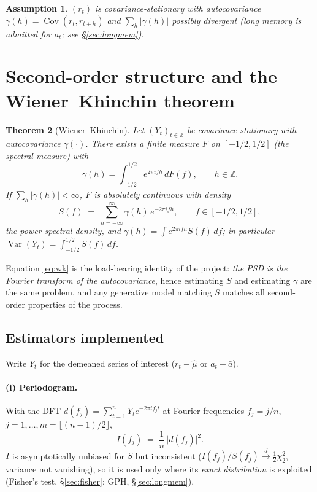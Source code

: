 \documentclass[11pt,a4paper]{article}
\newtheorem{theorem}{Theorem}[section]
\newtheorem{assumption}[theorem]{Assumption}
\DeclareMathOperator{\Var}{Var}
\DeclareMathOperator{\Cov}{Cov}
\begin{document}
\begin{assumption}\label{ass:stat}
$(r_t)$ is covariance-stationary with autocovariance
$\gamma(h)=\Cov(r_t,r_{t+h})$ and $\sum_h |\gamma(h)|$ possibly divergent (long
memory is admitted for $a_t$; see \S\ref{sec:longmem}).
\end{assumption}

\section{Second-order structure and the Wiener--Khinchin theorem}

\begin{theorem}[Wiener--Khinchin]\label{thm:wk}
Let $(Y_t)_{t\in\mathbb{Z}}$ be covariance-stationary with autocovariance
$\gamma(\cdot)$. There exists a finite measure $F$ on $[-1/2,1/2]$ (the spectral
measure) with
\begin{equation}
\gamma(h) = \int_{-1/2}^{1/2} e^{2\pi i f h}\, dF(f), \qquad h\in\mathbb{Z}.
\end{equation}
If $\sum_h |\gamma(h)|<\infty$, $F$ is absolutely continuous with density
\begin{equation}
S(f) \;=\; \sum_{h=-\infty}^{\infty} \gamma(h)\, e^{-2\pi i f h},
\qquad f \in [-1/2, 1/2],
\label{eq:wk}
\end{equation}
the \emph{power spectral density}, and $\gamma(h)=\int e^{2\pi ifh}S(f)\,df$; in
particular $\Var(Y_t)=\int_{-1/2}^{1/2} S(f)\,df$.
\end{theorem}

Equation \eqref{eq:wk} is the load-bearing identity of the project: \emph{the PSD is
the Fourier transform of the autocovariance}, hence estimating $S$ and estimating
$\gamma$ are the same problem, and any generative model matching $S$ matches all
second-order properties of the process.

\subsection{Estimators implemented}\label{sec:estimators}

Write $Y_t$ for the demeaned series of interest ($r_t-\hat\mu$ or $a_t-\bar a$).

\paragraph{(i) Periodogram.} With the DFT
$d(f_j)=\sum_{t=1}^{n} Y_t e^{-2\pi i f_j t}$ at Fourier frequencies
$f_j=j/n$, $j=1,\dots,m=\lfloor (n-1)/2\rfloor$,
\begin{equation}
I(f_j) \;=\; \frac{1}{n}\,\bigl|d(f_j)\bigr|^2 .
\end{equation}
$I$ is asymptotically unbiased for $S$ but inconsistent
($I(f_j)/S(f_j)\xrightarrow{d}\tfrac12\chi^2_2$, variance not vanishing), so it is
used only where its \emph{exact distribution} is exploited (Fisher's test,
\S\ref{sec:fisher}; GPH, \S\ref{sec:longmem}).
\end{document}
